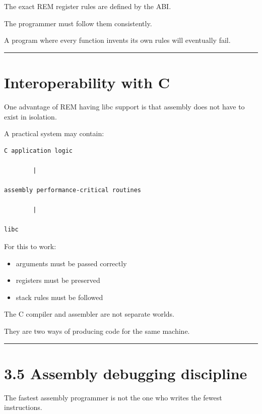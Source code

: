 \documentclass[
  oneside,
  openany]{book}
\providecommand{\tightlist}{%
  \setlength{\itemsep}{0pt}\setlength{\parskip}{0pt}}
\begin{document}
The exact REM register rules are defined by the ABI.

The programmer must follow them consistently.

A program where every function invents its own rules will eventually
fail.

\begin{center}\rule{0.5\linewidth}{0.5pt}\end{center}

\hypertarget{interoperability-with-c}{%
\section{Interoperability with C}\label{interoperability-with-c}}

One advantage of REM having libc support is that assembly does not have
to exist in isolation.

A practical system may contain:

\begin{verbatim}
C application logic

        |

assembly performance-critical routines

        |

libc
\end{verbatim}

For this to work:

\begin{itemize}
\tightlist
\item
  arguments must be passed correctly
\item
  registers must be preserved
\item
  stack rules must be followed
\end{itemize}

The C compiler and assembler are not separate worlds.

They are two ways of producing code for the same machine.

\begin{center}\rule{0.5\linewidth}{0.5pt}\end{center}

\hypertarget{assembly-debugging-discipline}{%
\section{3.5 Assembly debugging
discipline}\label{assembly-debugging-discipline}}

The fastest assembly programmer is not the one who writes the fewest
instructions.
\end{document}
